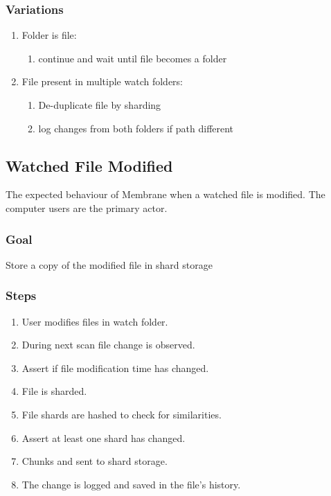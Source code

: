 \documentclass[11pt, a4paper, twoside]{report}
\begin{document}
\subsubsection{Variations}
\begin{enumerate}
  \item Folder is file:
	\begin{enumerate}
	  \item continue and wait until file becomes a folder
	\end{enumerate}
  \item File present in multiple watch folders:
	\begin{enumerate}
	  \item De-duplicate file by sharding
	  \item log changes from both folders if path different
	\end{enumerate}
\end{enumerate}

\subsection{Watched File Modified}
The expected behaviour of Membrane when a watched file is modified. The computer users are the primary actor.

\subsubsection{Goal}

Store a copy of the modified file in shard storage

\subsubsection{Steps}

\begin{enumerate}
 \item User modifies files in watch folder.
 \item During next scan file change is observed.
 \item Assert if file modification time has changed.
 \item File is sharded.
 \item File shards are hashed to check for similarities.
 \item Assert at least one shard has changed.
 \item Chunks and sent to shard storage.
 \item The change is logged and saved in the file's history.
\end{enumerate}
\end{document}
